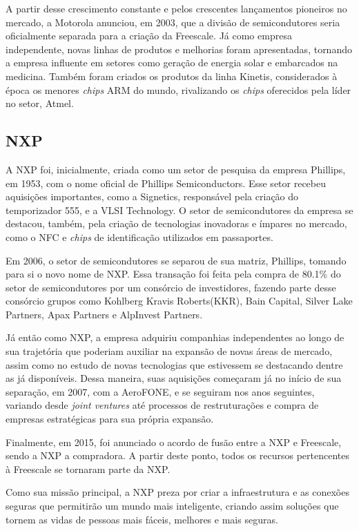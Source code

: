 \documentclass[
	12pt,				%
    oneside,			%
	a4paper,			%
	english,			%
	french,				%
	spanish,			%
	brazil				%
	]{abntex2}
\begin{document}
A partir desse crescimento constante e pelos crescentes lançamentos pioneiros no mercado, a Motorola anunciou, em 2003, que a divisão de semicondutores seria oficialmente separada para a criação da Freescale. Já como empresa independente, novas linhas de produtos e melhorias foram apresentadas, tornando a empresa influente em setores como geração de energia solar e embarcados na medicina. Também foram criados os produtos da linha Kinetis, considerados à época os menores \textit{chips} ARM do mundo, rivalizando os \textit{chips} oferecidos pela líder no setor, Atmel. 

\subsection{NXP}

A NXP foi, inicialmente, criada como um setor de pesquisa da empresa Phillips, em 1953, com o nome oficial de Phillips Semiconductors. Esse setor recebeu aquisições importantes, como a Signetics, responsável pela criação do temporizador 555, e a VLSI Technology. O setor de semicondutores da empresa se destacou, também, pela criação de tecnologias inovadoras e ímpares no mercado, como o NFC e \textit{chips} de identificação utilizados em passaportes.

Em 2006, o setor de semicondutores se separou de sua matriz, Phillips, tomando para si o novo nome de NXP. Essa transação foi feita pela compra de 80.1\% do setor de semicondutores por um consórcio de investidores, fazendo parte desse consórcio grupos como Kohlberg Kravis Roberts(KKR), Bain Capital, Silver Lake Partners, Apax Partners e AlpInvest Partners.



Já então como NXP, a empresa adquiriu companhias independentes ao longo de sua trajetória que poderiam auxiliar na expansão de novas áreas de mercado, assim como no estudo de novas tecnologias que estivessem se destacando dentre as já disponíveis. Dessa maneira, suas aquisições começaram já no início de sua separação, em 2007, com a AeroFONE, e se seguiram nos anos seguintes, variando desde \textit{joint ventures} até processos de restruturações e compra de empresas estratégicas para sua própria expansão.

Finalmente, em 2015, foi anunciado o acordo de fusão entre a NXP e Freescale, sendo a NXP a compradora. A partir deste ponto, todos os recursos pertencentes à Freescale se tornaram parte da NXP.

Como sua missão principal, a NXP preza por criar a infraestrutura e as conexões seguras que permitirão um mundo mais inteligente, criando assim soluções que tornem as vidas de pessoas mais fáceis, melhores e mais seguras.
\end{document}
